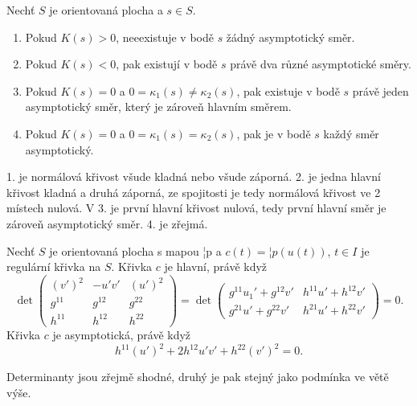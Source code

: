\documentclass[12pt]{article}                   %
\begin{document}
        \begin{veta}
            Nechť $S$ je orientovaná plocha a $s \in S$.
            \begin{enumerate}
                \item Pokud $K(s) > 0$, neeexistuje v bodě $s$ žádný asymptotický směr.
                \item Pokud $K(s) < 0$, pak existují v bodě $s$ právě dva různé asymptotické směry.
                \item Pokud $K(s) = 0$ a $0 = \kappa_1(s) ≠ \kappa_2(s)$, pak existuje v bodě $s$ právě jeden asymptotický směr, který je zároveň hlavním směrem.
                \item Pokud $K(s) = 0$ a $0 = \kappa_1(s) = \kappa_2(s)$, pak je v bodě $s$ každý směr asymptotický.
            \end{enumerate}

            \begin{dukazin}
                1. je normálová křivost všude kladná nebo všude záporná. 2. je jedna hlavní křivost kladná a druhá záporná, ze spojitosti je tedy normálová křivost ve 2 místech nulová. V 3. je první hlavní křivost nulová, tedy první hlavní směr je zároveň asymptotický směr. 4. je zřejmá.
            \end{dukazin}
        \end{veta}

        \begin{veta}
            Nechť $S$ je orientovaná plocha s mapou ¦p a $c(t) = ¦p(u(t))$, $t \in I$ je regulární křivka na $S$. Křivka $c$ je hlavní, právě když
            $$ \det \begin{pmatrix} (v')^2 & -u'v' & (u')^2 \\ g^11 & g^{12} & g^{22} \\ h^{11} & h^{12} & h^{22} \end{pmatrix} = \det \begin{pmatrix} g^{11}u_1' + g^{12}v' & h^{11}u' + h^{12}v' \\ g^{21}u' + g^{22}v' & h^{21}u' + h^{22}v' \end{pmatrix} = 0. $$
            Křivka $c$ je asymptotická, právě když
            $$ h^{11}(u')^2 + 2h^{12}u'v' + h^{22}(v')^2 = 0. $$ 

            \begin{dukazin}
                Determinanty jsou zřejmě shodné, druhý je pak stejný jako podmínka ve větě výše.
            \end{dukazin}
        \end{veta}
\end{document}
